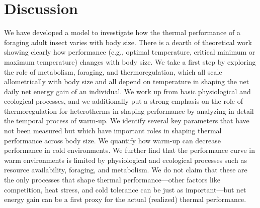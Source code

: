 \section*{Discussion}

We have developed a model to investigate how the thermal performance of a foraging adult insect varies with body size.
There is a dearth of theoretical work showing clearly how performance (e.g., optimal temperature, critical minimum or maximum temperature) changes with body size.
We take a first step by exploring the role of metabolism, foraging, and thermoregulation, which all scale allometrically with body size and all depend on temperature in shaping the net daily net energy gain of an individual.
We work up from basic physiological and ecological processes, and we additionally put a strong emphasis on the role of thermoregulation for heterotherms in shaping performance by analyzing in detail the temporal process of warm-up.
We identify several key parameters that have not been measured but which have important roles in shaping thermal performance across body size.
We quantify how warm-up can decrease performance in cold environments.
We further find that the performance curve in warm environments is limited by physiological and ecological processes such as resource availability, foraging, and metabolism.
We do not claim that these are the only processes that shape thermal performance---other factors like competition, heat stress, and cold tolerance can be just as important---but net energy gain can be a first proxy for the actual (realized) thermal performance.


